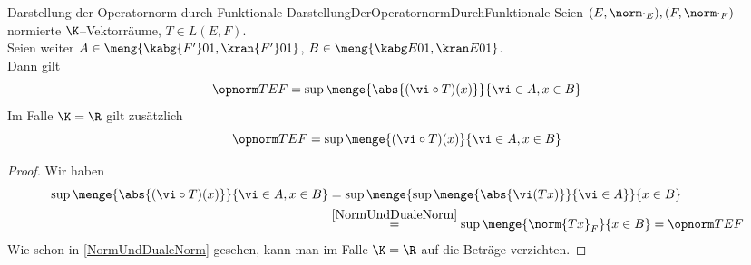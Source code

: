 \begin{korollar}{Darstellung der Operatornorm durch Funktionale}
                {DarstellungDerOperatornormDurchFunktionale}
Seien $(E, \norm \cdot_E), (F, \norm\cdot_F)$ normierte $\K$--Vektorräume, 
$T \in L(E, F)$.\\
Seien weiter 
$A \in \meng{\kabg{F'} 0 1, \kran{F'} 0 1}$,
$B \in \meng{\kabg E 0 1, \kran E 0 1}$.\\
Dann gilt \[\opnorm TEF=\sup\menge{\abs{(\vi\circ T)(x)}}{\vi \in A, x\in B}\]
Im Falle $\K = \R$ gilt zusätzlich
\[\opnorm TEF=\sup\menge{(\vi\circ T)(x)}{\vi \in A, x\in B}\]
\end{korollar}
\begin{proof}
Wir haben
\begin{align*}
 \sup\menge{\abs{(\vi\circ T)(x)}}{\vi \in A, x\in B}
& = \sup\menge{ \sup\menge{\abs{\vi(Tx)}}{\vi \in A} }{x \in B}\\
& \overset{\ref{NormUndDualeNorm}}{=} 
    \sup\menge{ \norm{Tx}_F }{x \in B} = \opnorm T E F
\end{align*}
Wie schon in \ref{NormUndDualeNorm} gesehen, kann man im Falle $\K = \R$
auf die Beträge verzichten.
\end{proof}